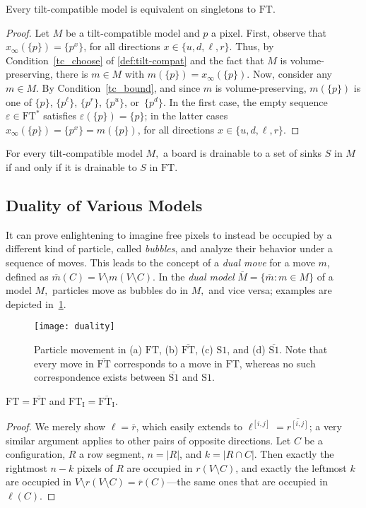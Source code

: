 \documentclass[a4paper,UKenglish,cleveref,thm-restate]{lipics-v2021}
\newcommand{\FT}{\ensuremath{\mathrm{FT}}\xspace}
\newcommand{\SSt}{\ensuremath{\mathrm{S1}}\xspace}
\newcommand{\IE}[1][\FT]{\ensuremath{{#1}_\mathrm{I}}\xspace}
\newcommand{\dual}[1]{\ensuremath{\overline{#1}}\xspace}
\begin{document}
\begin{proposition}\label{tc_equiv_ft}
Every tilt-compatible model is equivalent on singletons to \FT.
\end{proposition}
\begin{proof}
Let $M$ be a tilt-compatible model and $p$ a pixel. First, observe that
\(x_\infty(\{p\}) = \{p^x\}\), for all directions \(x \in \{u, d, \ell,
r\}\). Thus, by Condition~\ref{tc_choose} of \cref{def:tilt-compat} and the fact
that $M$ is volume-preserving, there is $m \in M$ with \(m(\{p\}) =
x_\infty(\{p\})\). Now, consider any $m \in M$. By Condition~\ref{tc_bound}, and
since $m$ is volume-preserving, $m(\{p\})$ is one of $\{p\}$, $\{p^\ell\}$,
$\{p^r\}$, $\{p^u\}$, or~$\{p^d\}$. In the first case, the empty sequence
$\varepsilon \in \FT^*$ satisfies \(\varepsilon(\{p\}) = \{p\}\); in the latter
cases \(x_\infty(\{p\}) = \{p^x\} = m (\{p\})\), for all directions \(x \in \{u,
d, \ell, r\}\).
\end{proof}

\begin{corollary}\label{cor:drainable-tc}
For every tilt-compatible model $M,$ a board is drainable to a set of sinks $S$
in $M$ if and only if it is drainable to $S$ in \FT.
\end{corollary}

\subsection{Duality of Various Models}\label{subsec:duality}

It can prove enlightening to imagine free pixels to instead be occupied by a
different kind of particle, called \emph{bubbles}, and analyze their behavior
under a sequence of moves. This leads to the concept of a \emph{dual move} for a
move $m$, defined as $\dual{m}(C) = V \setminus m(V \setminus C)$. In the
\emph{dual model} \(\dual{M} = \{\dual{m}: m \in M\}\) of a model $M,$ particles
move as bubbles do in $M,$ and vice versa; examples are depicted in~\cref{fig:duality}.

\begin{figure}[htb]
\centering
\texttt{[image: duality]}\caption{Particle movement in (a) \FT, (b) \dual{\FT}, (c) \SSt, and (d)
  \dual{\SSt}. Note that every move in \dual{\FT} corresponds to a move in \FT,
  whereas no such correspondence exists between \dual{\SSt} and
  \SSt.}\label{fig:duality}
\end{figure}

\begin{proposition}\label{prop:ft-dual}
\(\FT = \dual{\FT}\) and \(\IE = \dual{\IE}\).
\end{proposition}
\begin{proof}
We merely show $\ell = \dual{r}$, which easily extends to \(\ell^{[i,j]} =
\dual{r^{[i,j]}}\); a very similar argument applies to other pairs of opposite
directions. Let $C$ be a configuration, $R$ a row segment, $n=|R|$, and \(k=|R
\cap C|\). Then exactly the rightmost $n-k$ pixels of $R$ are occupied in \(r(V
\setminus C)\), and exactly the leftmost $k$ are occupied in \(V \setminus r(V
\setminus C) = \dual{r}(C)\)---the same ones that are occupied in $\ell(C)$.
\end{proof}
\end{document}
